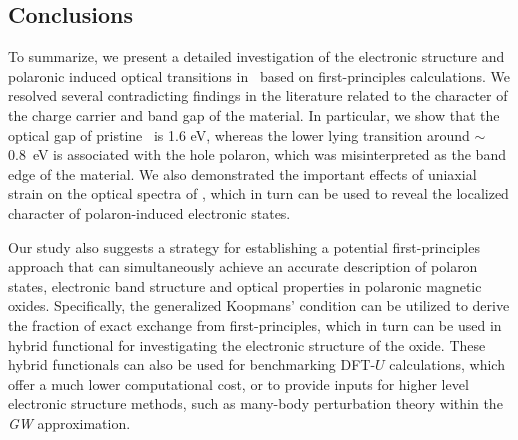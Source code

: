 \subsection{Conclusions}

To summarize, we present a detailed investigation of the electronic structure and polaronic induced optical transitions in \co\ based on first-principles calculations. We resolved several contradicting findings in the literature related to the character of the charge carrier and band gap of the material. In particular, we show that the optical gap of pristine \co\ is 1.6 eV, whereas the lower lying transition around $\sim$0.8~eV is associated with the hole polaron, which was misinterpreted as the band edge of the material. We also demonstrated the important effects of uniaxial strain on the optical spectra of \co, which in turn can be used to reveal the localized character of polaron-induced electronic states.

Our study also suggests a strategy for establishing a potential first-principles approach that can simultaneously achieve an accurate description of polaron states, electronic band structure and optical properties in polaronic magnetic oxides. Specifically, the generalized Koopmans' condition can be utilized to derive the fraction of exact exchange from first-principles, which in turn can be used in hybrid functional for investigating the electronic structure of the oxide. These hybrid functionals can also be used for benchmarking DFT-$U$ calculations, which offer a much lower computational cost, or to provide inputs for higher level electronic structure methods, such as many-body perturbation theory within the \textit{GW} approximation.
